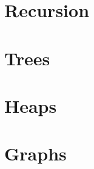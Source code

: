 \documentclass[c, aspectratio=169]{beamer}
\begin{document}
\section{Recursion}
\begin{frame}\end{frame}
\begin{frame}\end{frame}
\begin{frame}\end{frame}

\section{Trees}
\begin{frame}\end{frame}
\begin{frame}\end{frame}
\begin{frame}\end{frame}

\section{Heaps}
\begin{frame}\end{frame}
\begin{frame}\end{frame}
\begin{frame}\end{frame}

\section{Graphs}
\begin{frame}\end{frame}
\begin{frame}\end{frame}
\begin{frame}\end{frame}


\end{document}
